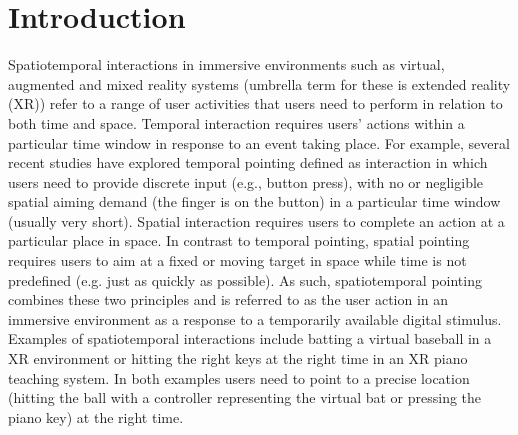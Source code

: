 \documentclass[manuscript,screen]{acmart}
\begin{document}



\maketitle

\section{Introduction}
Spatiotemporal interactions in immersive environments such as virtual, augmented and mixed reality systems (umbrella term for these is extended reality (XR)) refer to a range of user activities that users need to perform in relation to both time and space. Temporal interaction requires users’ actions within a particular time window in response to an event taking place. For example, several recent studies have explored temporal pointing \cite{lee2016modelling} defined as interaction in which users need to provide discrete input (e.g., button press), with no or negligible spatial aiming demand (the finger is on the button) in a particular time window (usually very short). Spatial interaction requires users to complete an action at a particular place in space. In contrast to temporal pointing, spatial pointing requires users to aim at a fixed or moving target in space while time is not predefined (e.g. just as quickly as possible). As such, spatiotemporal pointing combines these two principles and is referred to as the user action in an immersive environment as a response to a temporarily available digital stimulus. Examples of spatiotemporal interactions include batting a virtual baseball in a XR environment or hitting the right keys at the right time in an XR piano teaching system. In both examples users need to point to a precise location (hitting the ball with a controller representing the virtual bat or pressing the piano key) at the right time. \\
\end{document}
